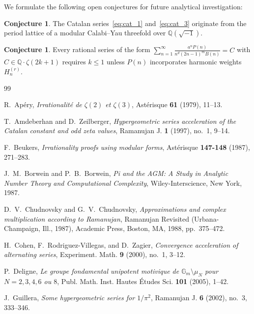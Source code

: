 \documentclass[11pt,a4paper]{article}
\theoremstyle{definition}
\newtheorem{conjecture}[theorem]{Conjecture}
\begin{document}
We formulate the following open conjectures for future analytical investigation:
\begin{conjecture}
The Catalan series~\eqref{eq:cat_1} and~\eqref{eq:cat_3} originate from the period lattice of a modular Calabi--Yau threefold over $\mathbb{Q}(\sqrt{-1})$.
\end{conjecture}
\begin{conjecture}
Every rational series of the form $\sum_{n=1}^\infty \frac{a^n P(n)}{n^d (2n-1)^m B(n)} = C$ with $C \in \mathbb{Q} \cdot \zeta(2k+1)$ requires $k \le 1$ unless $P(n)$ incorporates harmonic weights $H_n^{(r)}$.
\end{conjecture}

\begin{thebibliography}{99}

R.~Ap\'ery,
\emph{Irrationalit\'e de $\zeta(2)$ et $\zeta(3)$},
Ast\'erisque \textbf{61} (1979), 11--13.

T.~Amdeberhan and D.~Zeilberger,
\emph{Hypergeometric series acceleration of the Catalan constant and odd zeta values},
Ramanujan J. \textbf{1} (1997), no.~1, 9--14.

F.~Beukers,
\emph{Irrationality proofs using modular forms},
Ast\'erisque \textbf{147-148} (1987), 271--283.

J.~M.~Borwein and P.~B.~Borwein,
\emph{Pi and the AGM: A Study in Analytic Number Theory and Computational Complexity},
Wiley-Interscience, New York, 1987.

D.~V.~Chudnovsky and G.~V.~Chudnovsky,
\emph{Approximations and complex multiplication according to Ramanujan},
Ramanujan Revisited (Urbana-Champaign, Ill., 1987), Academic Press, Boston, MA, 1988, pp.~375--472.

H.~Cohen, F.~Rodriguez-Villegas, and D.~Zagier,
\emph{Convergence acceleration of alternating series},
Experiment. Math. \textbf{9} (2000), no.~1, 3--12.

P.~Deligne,
\emph{Le groupe fondamental unipotent motivique de $\mathbb{G}_m \setminus \mu_N$ pour $N = 2, 3, 4, 6$ ou $8$},
Publ. Math. Inst. Hautes \'Etudes Sci. \textbf{101} (2005), 1--42.

J.~Guillera,
\emph{Some hypergeometric series for $1/\pi^2$},
Ramanujan J. \textbf{6} (2002), no.~3, 333--346.


\end{thebibliography}
\end{document}
